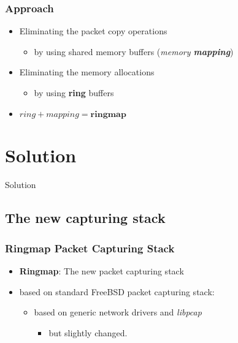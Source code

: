 \documentclass{beamer}
\begin{document}
\begin{frame}
\frametitle{Approach}
\begin{itemize}
	\item<1-> Eliminating the packet copy operations
		\begin{itemize}
			\item<1-> by using shared memory buffers (\emph{memory \textbf{mapping}})\newline
		\end{itemize}
	\item<1-> Eliminating the memory allocations
		\begin{itemize}
			\item<1-> by using \textbf{ring} buffers\newline \newline
		\end{itemize}
	\item<2->[$\Rightarrow$] $ring + mapping = \textbf{ringmap}$
\end{itemize}
\end{frame}

\section{Solution}

\begin{frame}
	\begin{center}
	\huge{Solution}
	\end{center}
\end{frame}


\subsection*{The new capturing stack}
\begin{frame}
\frametitle{Ringmap Packet Capturing Stack}
\begin{itemize}
	\item \textbf{Ringmap}: The new packet capturing stack
	\item based on standard FreeBSD packet capturing stack: 		
		\begin{itemize}
			\item based on generic network drivers and \emph{libpcap}
			\begin{itemize}
				\item but slightly changed.\newline
			\end{itemize}
		\end{itemize}
\end{itemize}
\end{frame}
\end{document}
